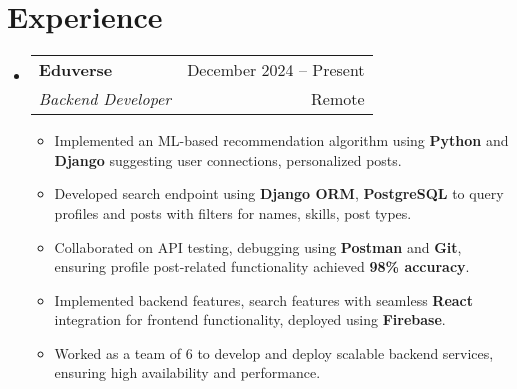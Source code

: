 \documentclass[letterpaper,11pt]{article}
\makeatletter
\newcommand{\resumeItem}[1]{
  \item\small{
    {#1 \vspace{-3pt}}
  }
}
\newcommand{\resumeSubheading}[4]{
    \item
    \begin{tabular*}{0.97\textwidth}[t]{l@{\extracolsep{\fill}}r@{\hspace{-0.2in}}}
        \small{\textbf{#1}} & \small{#2} \\
        \textit{\small#3} & \small #4 \\
    \end{tabular*}\vspace{-7pt}
}
\newcommand{\resumeSubHeadingListStart}{\begin{itemize}[leftmargin=0.00in, rightmargin=-0.2in, label={}]}
\newcommand{\resumeSubHeadingListEnd}{\end{itemize}\vspace{-7pt}}
\newcommand{\resumeItemListStart}{\begin{itemize}[leftmargin=0.15in, rightmargin=0.15in]}
\newcommand{\resumeItemListEnd}{\end{itemize}\vspace{-7pt}}
\makeatother
\begin{document}



\section{Experience}

\resumeSubHeadingListStart
\resumeSubheading
{Eduverse}{December 2024 -- Present}
{Backend Developer}{Remote}
\resumeItemListStart
\resumeItem{Implemented an ML-based recommendation algorithm using \textbf{Python} and \textbf{Django} suggesting user connections, personalized posts.}
\resumeItem{Developed search endpoint using \textbf{Django ORM}, \textbf{PostgreSQL} to query profiles and posts with filters for names, skills, post types.}
\resumeItem{Collaborated on API testing, debugging using \textbf{Postman} and \textbf{Git}, ensuring profile post-related functionality achieved \textbf{98\% accuracy}.}
\resumeItem{Implemented backend features, search features with seamless \textbf{React} integration for frontend functionality, deployed using \textbf{Firebase}.}
\resumeItem{Worked as a team of 6 to develop and deploy scalable backend services, ensuring high availability and performance.}
\resumeItemListEnd
\resumeSubHeadingListEnd
\end{document}
